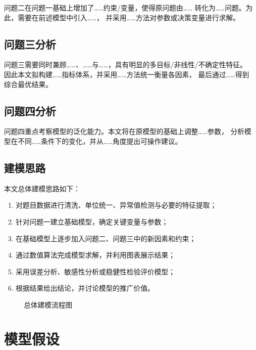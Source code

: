 \documentclass[UTF8,fontset=none,a4paper,12pt]{ctexart}
\begin{document}
问题二在问题一基础上增加了……约束/变量，使得原问题由……
转化为……问题。为此，需要在前述模型中引入……，
并采用……方法对参数或决策变量进行求解。

\subsection{问题三分析}

问题三需要同时兼顾……、……与……，具有明显的多目标/非线性/不确定性特征。
因此本文拟构建……指标体系，并采用……方法统一衡量各因素，
最后通过……得到综合最优结果。

\subsection{问题四分析}

问题四重点考察模型的泛化能力。本文将在原模型的基础上调整……参数，
分析模型在不同……条件下的变化，并从……角度提出可操作建议。

\subsection{建模思路}

本文总体建模思路如下：
\begin{enumerate}
  \item 对题目数据进行清洗、单位统一、异常值检测与必要的特征提取；
  \item 针对问题一建立基础模型，确定关键变量与参数；
  \item 在基础模型上逐步加入问题二、问题三中的新因素和约束；
  \item 通过数值算法完成模型求解，并利用图表展示结果；
  \item 采用误差分析、敏感性分析或稳健性检验评价模型；
  \item 根据结果给出结论，并讨论模型的推广价值。
\end{enumerate}

\begin{figure}[H]
  \centering
  \fbox{\rule{0pt}{5.0cm}\rule{0.86\textwidth}{0pt}}
  \caption{总体建模流程图}
  \label{fig:workflow}
\end{figure}

\section{模型假设}
\end{document}
